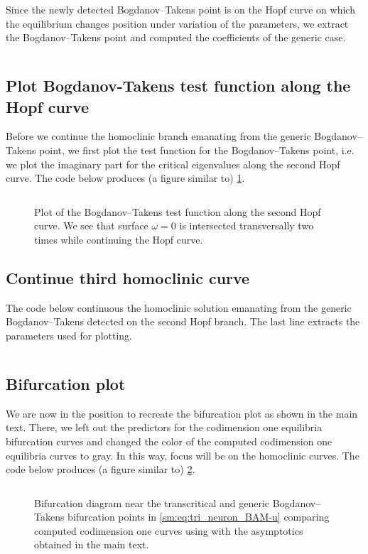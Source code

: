 Since the newly detected Bogdanov--Takens point is on the Hopf curve
on which the equilibrium changes position under variation of the
parameters, we extract the Bogdanov--Takens point and computed the coefficients
of the generic case.
\inputminted[firstline=179, lastline=181]{MATLAB}{\pathToDDEBifToolDemos/BAM_neural_network_model/BAMnn.m}

\subsection{Plot Bogdanov-Takens test function along the Hopf curve}
Before we continue the homoclinic branch emanating from the generic
Bogdanov--Takens point, we first plot the test function for the Bogdanov--Takens
point, i.e. we plot the imaginary part for the critical eigenvalues along the
second Hopf curve. The code below produces (a figure similar to)
\cref{sm:fig:triNeuronBAMNeuralNetworkModelTestfunction}.
\inputminted[firstline=185, lastline=197]{MATLAB}{\pathToDDEBifToolDemos/BAM_neural_network_model/BAMnn.m}
%
\begin{figure}[ht]
    \centering
    \caption{Plot of the Bogdanov--Takens test function along the second Hopf curve. 
    We see that surface $\omega=0$ is intersected transversally two times
    while continuing the Hopf curve.}
    \label{sm:fig:triNeuronBAMNeuralNetworkModelTestfunction}
\end{figure}

\subsection{Continue third homoclinic curve}
The code below continuous the homoclinic solution emanating from the generic Bogdanov--Takens detected
on the second Hopf branch. The last line extracts the parameters used for plotting.
\inputminted[firstline=199, lastline=205]{MATLAB}{\pathToDDEBifToolDemos/BAM_neural_network_model/BAMnn.m}

\subsection{Bifurcation plot}
We are now in the position to recreate the bifurcation plot as shown in the main text. There, we
left out the predictors for the codimension one equilibria bifurcation curves and changed the color
of the computed codimension one equilibria curves to gray. In this way, focus will be on
the homoclinic curves. The code below produces (a figure similar to)
\cref{sm:fig:triNeuronBAMNeuralNetworkModelCompareParameters}.
\inputminted[firstline=213, lastline=243]{MATLAB}{\pathToDDEBifToolDemos/BAM_neural_network_model/BAMnn.m}
\begin{figure}[ht]
    \caption{
    Bifurcation diagram near the transcritical and generic Bogdanov--Takens
    bifurcation points in \cref{sm:eq:tri_neuron_BAM-u} comparing computed
    codimension one curves using \DDEBIFTOOL with the asymptotics obtained in the 
    main text.}
    \label{sm:fig:triNeuronBAMNeuralNetworkModelCompareParameters}
\end{figure}

